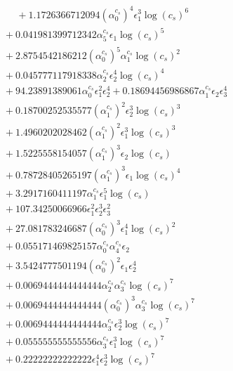 \documentclass[10pt]{article}
\begin{document}
\begin{align*}
\phantom{F_{s,7}} &\phantom{={}}{}  + 1.1726366712094 \left(\alpha_{0}^{c_s}\right)^{4} \epsilon_{1}^{3} \log{\left(c_{s} \right)}^{6} \\
&{}  + 0.041981399712342 \alpha_{5}^{c_s} \epsilon_{1} \log{\left(c_{s} \right)}^{5} \\
&{}  + 2.8754542186212 \left(\alpha_{0}^{c_s}\right)^{5} \alpha_{1}^{c_s} \log{\left(c_{s} \right)}^{2} \\
&{}  + 0.045777117918338 \alpha_{2}^{c_s} \epsilon_{2}^{4} \log{\left(c_{s} \right)}^{4} \\
&{}  + 94.23891389061 \alpha_{0}^{c_s} \epsilon_{1}^{2} \epsilon_{2}^{4} + 0.18694456986867 \alpha_{1}^{c_s} \epsilon_{2} \epsilon_{3}^{4} \\
&{}  + 0.18700252535577 \left(\alpha_{1}^{c_s}\right)^{2} \epsilon_{2}^{3} \log{\left(c_{s} \right)}^{3} \\
&{}  + 1.4960202028462 \left(\alpha_{1}^{c_s}\right)^{2} \epsilon_{1}^{3} \log{\left(c_{s} \right)}^{3} \\
&{}  + 1.5225558154057 \left(\alpha_{1}^{c_s}\right)^{3} \epsilon_{2} \log{\left(c_{s} \right)} \\
&{}  + 0.78728405265197 \left(\alpha_{1}^{c_s}\right)^{3} \epsilon_{1} \log{\left(c_{s} \right)}^{4} \\
&{}  + 3.2917160411197 \alpha_{1}^{c_s} \epsilon_{1}^{5} \log{\left(c_{s} \right)} \\
&{}  + 107.34250066966 \epsilon_{1}^{2} \epsilon_{2}^{3} \epsilon_{3}^{2} \\
&{}  + 27.081783246687 \left(\alpha_{0}^{c_s}\right)^{3} \epsilon_{1}^{4} \log{\left(c_{s} \right)}^{2} \\
&{}  + 0.055171469825157 \alpha_{0}^{c_s} \alpha_{4}^{c_s} \epsilon_{2} \\
&{}  + 3.5424777501194 \left(\alpha_{0}^{c_s}\right)^{2} \epsilon_{1} \epsilon_{2}^{4} \\
&{}  + 0.0069444444444444 \alpha_{2}^{c_s} \alpha_{3}^{c_s} \log{\left(c_{s} \right)}^{7} \\
&{}  + 0.0069444444444444 \left(\alpha_{0}^{c_s}\right)^{3} \alpha_{3}^{c_s} \log{\left(c_{s} \right)}^{7} \\
&{}  + 0.0069444444444444 \alpha_{3}^{c_s} \epsilon_{2}^{3} \log{\left(c_{s} \right)}^{7} \\
&{}  + 0.055555555555556 \alpha_{3}^{c_s} \epsilon_{1}^{3} \log{\left(c_{s} \right)}^{7} \\
&{}  + 0.22222222222222 \epsilon_{1}^{4} \epsilon_{2}^{3} \log{\left(c_{s} \right)}^{7} \\

\end{align*}
\end{document}
